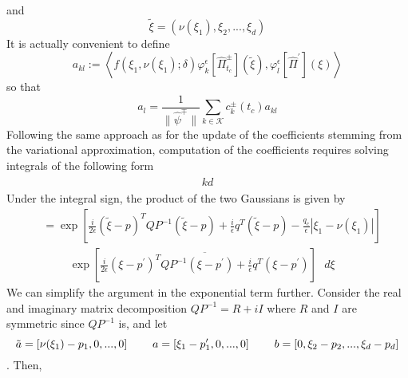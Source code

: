 and 
\[
  \tilde{\xi} = (\nu(\xi_1), \xi_2, ..., \xi_d) 
\]
It is actually convenient to define 
\[
  a_{kl} :=  
    \left \langle  
    f(\xi_1, \nu(\xi_1); \delta)
    \varphi_k^\epsilon[\hat{\Pi}^{\pm}_{t_c}](\tilde{\xi}), 
    \varphi_l^\epsilon[\hat{\Pi}^\prime](\xi)  \right \rangle
\]
so that 
\[
  a_l =  
    \frac{1}{\|\hat{\psi}^\mp \|}
    \sum_{k \in \mathcal{K}}c^{\pm}_{k}(t_c)
    a_{kl}
\]
Following the same approach as for the update of the coefficients 
stemming from the variational approximation, computation of 
the coefficients requires solving integrals of the following form 
\begin{align}
  \begin{split}
    kd
  \end{split}
\end{align}
\newpage
Under the integral sign, the product of the two Gaussians is given by 
\begin{equation}
  \begin{split}
    &= 
    \exp{\left[ 
        \frac{i}{2\epsilon}(\tilde{\xi}-p)^TQP^{-1}(\tilde{\xi}-p) +
      \frac{i}{\epsilon}q^T(\tilde{\xi}-p)
  -\frac{q_c}{\epsilon}|\xi_1 - \nu(\xi_1)| \right] }
  \\
    &\hspace{1cm}
    \exp{ \left[
      \overline{\frac{i}{2\epsilon}(\xi-p^\prime)^TQP^{-1}(\xi-p^\prime) +
      \frac{i}{\epsilon}q^T(\xi-p^\prime)}
    \right] } \text{ } d \xi
  \end{split}
\end{equation}
We can simplify the argument in the exponential term further. Consider the 
real and imaginary matrix decomposition $QP^{-1} = R + i I$ where $R$ and $I$
are symmetric since $QP^{-1}$ is, and let
\begin{equation}
  \tilde{a} = [\nu(\xi_1) - p_1, 0, ..., 0] 
  \hspace{.8cm}
  a = [\xi_1 - p_1^\prime, 0, ..., 0] 
  \hspace{.8cm}
  b = [0, \xi_2 - p_2, ..., \xi_d - p_d] 
\end{equation}. Then,
